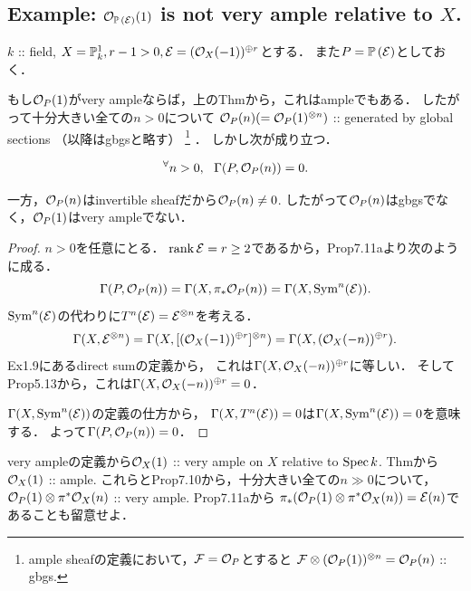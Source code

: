 \documentclass[a4paper]{jsarticle}
\newcommand{\Sym}{\operatorname{Sym}}
\newcommand{\pbundle}{\mathbb{P}\,}
\begin{document}
    \subsection{Example: $\shO_{\pbundle(\shE)}(1)$ is not very ample relative to $X$.}
    $k$ :: field, $X=\mathbb{P}^1_k, r-1>0, \mathcal{E}=(\mathcal{O}_X(-1))^{\oplus r}$とする．
    また$P=\pbundle(\shE)$としておく．

    もし$\mathcal{O}_P(1)$がvery ampleならば，上のThmから，これはampleでもある．
    したがって十分大きい全ての$n>0$について
    $\mathcal{O}_P(n)(=\mathcal{O}_P(1)^{\otimes n})$ :: generated by global sections （以降はgbgsと略す）
    \footnote
    {
        ample sheafの定義において，$\mathcal{F}=\mathcal{O}_P$とすると
        $\mathcal{F} \otimes (\mathcal{O}_P(1))^{\otimes n}=\mathcal{O}_P(n)$ :: gbgs.
    }
    ．
    しかし次が成り立つ．
    \begin{Claim}
        \[ {}^{\forall} n>0,~~ \Gamma(P, \mathcal{O}_P(n))=0. \]
    \end{Claim}
    一方，$\mathcal{O}_P(n)$はinvertible sheafだから$\mathcal{O}_P(n) \neq 0$.
    したがって$\mathcal{O}_P(n)$はgbgsでなく，$\mathcal{O}_P(1)$はvery ampleでない．
    \begin{proof}
        $n>0$を任意にとる．
        $\operatorname{rank} \mathcal{E}=r \geq 2$であるから，Prop7.11aより次のように成る．
        \[ \Gamma(P, \shO_P(n))=\Gamma(X, \pi_*\shO_P(n))=\Gamma(X, \Sym^n(\shE)). \]
        $\Sym^n(\shE)$の代わりに$T^n(\mathcal{E})=\mathcal{E}^{\otimes n}$を考える．
        \[
            \Gamma(X, \mathcal{E}^{\otimes n})
            =\Gamma(X, [(\mathcal{O}_X(-1))^{\oplus r}]^{\otimes n})
            =\Gamma(X, (\mathcal{O}_X(-n))^{\oplus r}).
        \]
        Ex1.9にあるdirect sumの定義から，
        これは$\Gamma(X, \mathcal{O}_X(-n))^{\oplus r}$に等しい．
        そしてProp5.13から，これは$\Gamma(X, \mathcal{O}_X(-n))^{\oplus r}=0$．

        $\Gamma(X, \Sym^n(\shE))$の定義の仕方から，
        $\Gamma(X, T^n(\mathcal{E}))=0$は$\Gamma(X, \Sym^n(\shE))=0$を意味する．
        よって$\Gamma(P, \mathcal{O}_P(n))=0$．
    \end{proof}

    \begin{Remark}
        very ampleの定義から$\mathcal{O}_X(1)$ :: very ample on $X$ relative to $\operatorname{Spec} k$.
        Thmから$\mathcal{O}_X(1)$ :: ample.
        これらとProp7.10から，十分大きい全ての$n \gg 0$について，
        $\mathcal{O}_P(1) \otimes \pi^* \mathcal{O}_X(n)$ :: very ample.
        Prop7.11aから
        $\pi_*(\mathcal{O}_P(1) \otimes \pi^* \mathcal{O}_X(n))=\mathcal{E}(n)$であることも留意せよ．
    \end{Remark}
\end{document}
